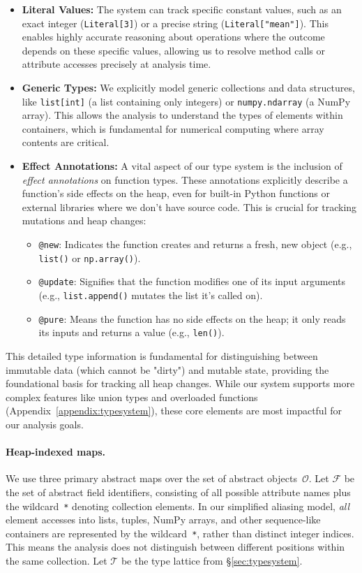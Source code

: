 \begin{itemize}
    \item \textbf{Literal Values:} The system can track specific constant values, such as an exact integer (\texttt{Literal[3]}) or a precise string (\texttt{Literal["mean"]}). This enables highly accurate reasoning about operations where the outcome depends on these specific values, allowing us to resolve method calls or attribute accesses precisely at analysis time.
    \item \textbf{Generic Types:} We explicitly model generic collections and data structures, like \texttt{list[int]} (a list containing only integers) or \texttt{numpy.ndarray} (a NumPy array). This allows the analysis to understand the types of elements within containers, which is fundamental for numerical computing where array contents are critical.
    \item \textbf{Effect Annotations:} A vital aspect of our type system is the inclusion of \emph{effect annotations} on function types. These annotations explicitly describe a function's side effects on the heap, even for built-in Python functions or external libraries where we don't have source code. This is crucial for tracking mutations and heap changes:
    \begin{itemize}
        \item \texttt{@new}: Indicates the function creates and returns a fresh, new object (e.g., \texttt{list()} or \texttt{np.array()}).
        \item \texttt{@update}: Signifies that the function modifies one of its input arguments (e.g., \texttt{list.append()} mutates the list it's called on).
        \item \texttt{@pure}: Means the function has no side effects on the heap; it only reads its inputs and returns a value (e.g., \texttt{len()}).
    \end{itemize}
\end{itemize}
This detailed type information is fundamental for distinguishing between immutable data (which cannot be "dirty") and mutable state, providing the foundational basis for tracking all heap changes. While our system supports more complex features like union types and overloaded functions (Appendix~\ref{appendix:typesystem}), these core elements are most impactful for our analysis goals.

\paragraph{Heap-indexed maps.}
We use three primary abstract maps over the set of abstract objects~$\mathcal{O}$.
Let $\mathcal{F}$ be the set of abstract field identifiers, consisting of
all possible attribute names plus the wildcard~\texttt{*} denoting collection
elements. In our simplified aliasing model, \emph{all} element accesses
into lists, tuples, NumPy arrays, and other sequence-like containers are
represented by the wildcard~\texttt{*}, rather than distinct integer indices.
This means the analysis does not distinguish between different positions
within the same collection.
Let $\mathcal{T}$ be the type lattice from \S\ref{sec:typesystem}.


